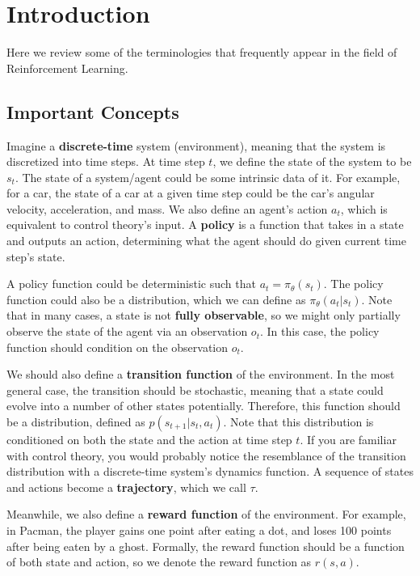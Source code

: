 \chapter{Introduction}

Here we review some of the terminologies that frequently appear in the field of Reinforcement Learning.
\section{Important Concepts}
Imagine a \textbf{discrete-time} system (environment), meaning that the system is discretized into time steps. At time step $t$, we define the state of the system to be $s_t$. The state of a system/agent could be some intrinsic data of it. For example, for a car, the state of a car at a given time step could be the car's angular velocity, acceleration, and mass. We also define an agent's action $a_t$, which is equivalent to control theory's input. A \textbf{policy} is a function that takes in a state and outputs an action, determining what the agent should do given current time step's state. 

A policy function could be deterministic such that $a_t = \pi_\theta(s_t)$. The policy function could also be a distribution, which we can define as $\pi_\theta(a_t|s_t)$. Note that in many cases, a state is not \textbf{fully observable}, so we might only partially observe the state of the agent via an observation $o_t$. In this case, the policy function should condition on the observation $o_t$. 

We should also define a \textbf{transition function} of the environment. In the most general case, the transition should be stochastic, meaning that a state could evolve into a number of other states potentially. Therefore, this function should be a distribution, defined as $p(s_{t+1}|s_t, a_t)$. Note that this distribution is conditioned on both the state and the action at time step $t$. If you are familiar with control theory, you would probably notice the resemblance of the transition distribution with a discrete-time system's dynamics function. A sequence of states and actions become a \textbf{trajectory}, which we call $\tau$.

Meanwhile, we also define a \textbf{reward function} of the environment. For example, in Pacman, the player gains one point after eating a dot, and loses 100 points after being eaten by a ghost. Formally, the reward function should be a function of both state and action, so we denote the reward function as $r(s,a)$.

